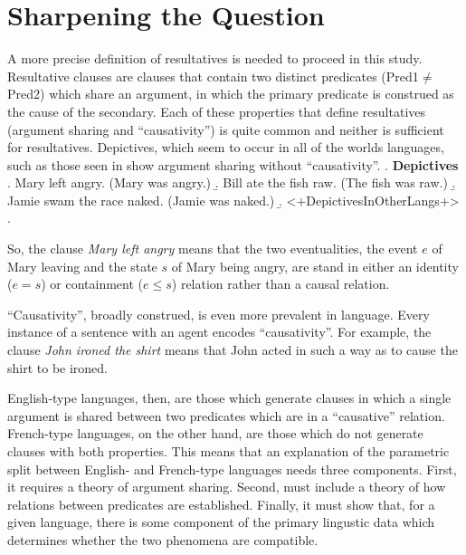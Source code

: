 \documentclass[letterpaper,12pt]{article}
\newcommand{\figex}{\refstepcounter{ExNo}\theExNo\hspace{\Exlabelsep}}
\begin{document}
\begin{figure}[h]
  \figex
  \label{fig:ParameterModel}
\end{figure}

\section{Sharpening the Question}\label{sec:result analysis}
A more precise definition of resultatives is needed to proceed in this study.
Resultative clauses are clauses that contain two distinct predicates (Pred1$\neq$Pred2) which share an argument, in which the primary predicate is construed as the cause of the secondary.
Each of these properties that define resultatives (argument sharing and ``causativity'') is quite common and neither is sufficient for resultatives.
Depictives, which seem to occur in all of the worlds languages, such as those seen in \Next show argument sharing without ``causativity''.
\ex. \textbf{Depictives}
\a. Mary left angry. (Mary was angry.)
\b. Bill ate the fish raw. (The fish was raw.)
\b. Jamie swam the race naked. (Jamie was naked.)
\b. <+DepictivesInOtherLangs+>
\z.

So, the clause \textit{Mary left angry} means that the two eventualities, the event $e$ of Mary leaving and the state $s$ of Mary being angry, are stand in either an identity ($e=s$) or containment ($e\leq s$) relation rather than a causal relation.

``Causativity'', broadly construed, is even more prevalent in language.
Every instance of a sentence with an agent encodes ``causativity''.
For example, the clause \textit{John ironed the shirt} means that John acted in such a way as to cause the shirt to be ironed.

English-type languages, then, are those which generate clauses in which a single argument is shared between two predicates which are in a ``causative'' relation.
French-type languages, on the other hand, are those which do not generate clauses with both properties.
This means that an explanation of the parametric split between English- and French-type languages needs three components.
First, it requires a theory of argument sharing.
Second, must include a theory of how relations between predicates are established.
Finally, it must show that, for a given language, there is some component of the primary lingustic data which determines whether the two phenomena are compatible.
\end{document}

